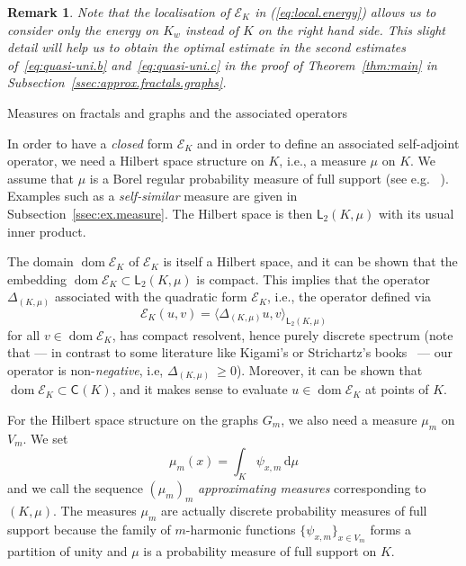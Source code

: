 \documentclass[12pt,reqno,a4paper]{amsart}            %
\makeatletter
\numberwithin{equation}{section}
\newcommand{\myfont}{\sffamily}
\theoremstyle{mythmstyle}       %
\theoremstyle{mydefstyle}        %
\newtheorem*{remark*}{Remark}
\renewcommand\subsection{\@startsection{subsection}{2}%
  \z@{-.5\linespacing\@plus-.7\linespacing}{.5\linespacing}%
  {\large\myfont\bfseries}}
\newcommand{\Subsec}[1]{Subsection~\ref{ssec:#1}}
\newcommand{\Thm}[1]{Theorem~\ref{thm:#1}}
\newcommand{\iprod}[3][{}]{\langle{#2},{#3}\rangle_{#1}}  %
\newcommand{\dd}    {\, \mathrm d}    %
\DeclareMathOperator{\dom}    {dom}
\newcommand{\1}{\mathbbm 1}                    %
\newcommand{\Contsymb} {\mathsf C}     %
\newcommand{\Lsymb}    {\mathsf L}     %
\newcommand{\Contspace}[1][{}]{\Contsymb^{#1}}     %
\newcommand{\Lpspace}[1][p]    {\Lsymb_{#1}}     %
\newcommand{\Lsqrspace}    {\Lpspace[2]}     %
\newcommand{\Cont}[2][{}]{\Contspace[#1]({#2})}
\newcommand{\Lsqr}[2][{}]{\Lsqrspace^{#1}({#2})} %
\newcommand{\energy}{\mathcal E}
\makeatother
\begin{document}
\begin{remark*}
  Note that the localisation of $\energy_K$ in (\ref{eq:local.energy})
  allows us to consider only the energy on $K_w$ instead of $K$ on
  the right hand side.  This slight detail will help us to obtain the
  optimal estimate in the second estimates of~\eqref{eq:quasi-uni.b}
  and~\eqref{eq:quasi-uni.c} in the proof of \Thm{main} in
  \Subsec{approx.fractals.graphs}.
\end{remark*}




\subsection{Measures on fractals and graphs and the associated
  operators}

In order to have a \emph{closed} form $\energy_K$ and in order to
define an associated self-adjoint operator, we need a Hilbert space
structure on $K$, i.e., a measure $\mu$ on $K$.  We assume that $\mu$
is a Borel regular probability measure of full support (see e.g.
~\cite[Sec.~1.4]{kigami:01}).  Examples such as a \emph{self-similar}
measure are given in \Subsec{ex.measure}.  The Hilbert space is then
$\Lsqr{K,\mu}$ with its usual inner product.


The domain $\dom \energy_K$ of $\energy_K$ is itself a Hilbert space,
and it can be shown that the embedding $\dom \energy_K \subset
\Lsqr{K,\mu}$ is compact.  This implies that the operator
$\Delta_{(K,\mu)}$ associated with the quadratic form $\energy_K$,
i.e., the operator defined via
\begin{equation*}
  \energy_K(u,v) = \iprod[\Lsqr{K,\mu}] {\Delta_{(K,\mu)} u} v
\end{equation*}
for all $v \in \dom \energy_K$, has compact resolvent, hence purely
discrete spectrum (note that --- in contrast to some literature like
Kigami's or Strichartz's books~\cite{kigami:01,strichartz:06} --- our
operator is non-\emph{negative}, i.e, $\Delta_{(K,\mu)}\ \ge 0$).
Moreover, it can be shown that $\dom \energy_K \subset \Cont K$, and
it makes sense to evaluate $u \in \dom \energy_K$ at points of $K$.


For the Hilbert space structure on the graphs $G_m$, we also need a
measure $\mu_m$ on $V_m$.  We set
\begin{equation}
  \label{eq:def.mu.m}
  \mu_m(x)=\int_K\psi_{x,m}\dd\mu
\end{equation}
and we call the sequence $(\mu_m)_m$ \emph{approximating measures}
corresponding to $(K,\mu)$.  The measures $\mu_m$ are actually
discrete probability measures of full support because the family of
$m$-harmonic functions $\{\psi_{x,m}\}_{x \in V_m}$ forms a partition
of unity and $\mu$ is a probability measure of full support on $K$.
\end{document}
